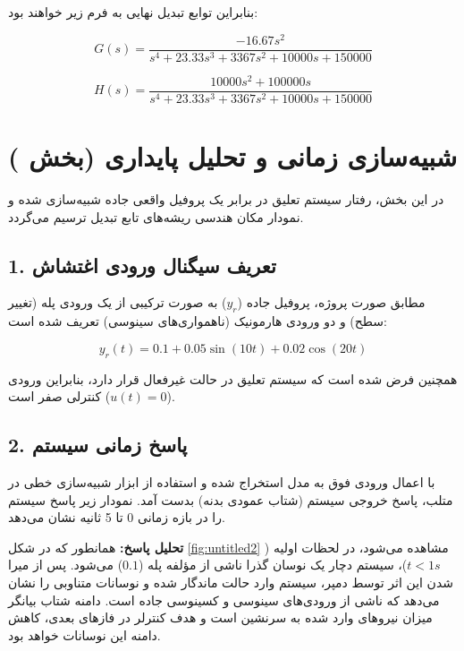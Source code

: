 \documentclass[a4paper]{article}
\begin{document}
	بنابراین توابع تبدیل نهایی به فرم زیر خواهند بود:
	
	\begin{equation}
		G(s) = \frac{-16.67 s^2}{s^4 + 23.33 s^3 + 3367 s^2 + 10000 s + 150000}
	\end{equation}
	
	\begin{equation}
		H(s) = \frac{10000 s^2 + 100000 s}{s^4 + 23.33 s^3 + 3367 s^2 + 10000 s + 150000}
	\end{equation}
	
	\section{شبیه‌سازی زمانی و تحلیل پایداری (بخش )}
	در این بخش، رفتار سیستم تعلیق در برابر یک پروفیل واقعی جاده شبیه‌سازی شده و نمودار مکان هندسی ریشه‌های تابع تبدیل ترسیم می‌گردد.
	
	\subsection{1. تعریف سیگنال ورودی اغتشاش}
	مطابق صورت پروژه، پروفیل جاده ($y_r$) به صورت ترکیبی از یک ورودی پله (تغییر سطح) و دو ورودی هارمونیک (ناهمواری‌های سینوسی) تعریف شده است:
	
	\begin{equation}
		y_r(t) = 0.1 + 0.05 \sin(10t) + 0.02 \cos(20t)
	\end{equation}
	
	همچنین فرض شده است که سیستم تعلیق در حالت غیرفعال قرار دارد، بنابراین ورودی کنترلی صفر است ($u(t) = 0$).
	
	\subsection{2. پاسخ زمانی سیستم}
	با اعمال ورودی فوق به مدل استخراج شده و استفاده از ابزار شبیه‌سازی خطی  در متلب، پاسخ خروجی سیستم (شتاب عمودی بدنه) بدست آمد. نمودار زیر پاسخ سیستم را در بازه زمانی 0 تا 5 ثانیه نشان می‌دهد.
	

	\textbf{تحلیل پاسخ:}
	همانطور که در شکل \ref{fig:untitled2} مشاهده می‌شود، در لحظات اولیه ($t < 1s$)، سیستم دچار یک نوسان گذرا ناشی از مؤلفه پله ($0.1$) می‌شود. پس از میرا شدن این اثر توسط دمپر، سیستم وارد حالت ماندگار شده و نوسانات متناوبی را نشان می‌دهد که ناشی از ورودی‌های سینوسی و کسینوسی جاده است. دامنه شتاب بیانگر میزان نیروهای وارد شده به سرنشین است و هدف کنترلر در فازهای بعدی، کاهش دامنه این نوسانات خواهد بود.
	
\end{document}
